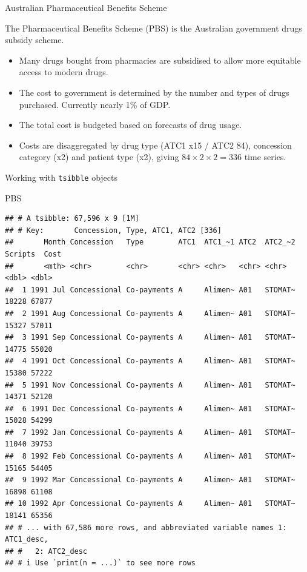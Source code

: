 \documentclass[14pt,ignorenonframetext,aspectratio=169]{beamer}
\newenvironment{Shaded}{\begin{snugshade}}{\end{snugshade}}
\newcommand{\NormalTok}[1]{#1}
\providecommand{\tightlist}{%
  \setlength{\itemsep}{0pt}\setlength{\parskip}{0pt}}
\renewenvironment{Shaded}{\color{black}\begin{snugshade}\color{black}}{\end{snugshade}}
\renewenvironment{Shaded}{\color{black}\fontsize{10}{10}\sf\begin{snugshade}\color{black}}{\end{snugshade}}
\begin{document}
\begin{frame}{Australian Pharmaceutical Benefits Scheme}
\protect\hypertarget{australian-pharmaceutical-benefits-scheme-1}{}
\begin{block}{}
The \alert{Pharmaceutical Benefits Scheme} (PBS) is the Australian government drugs subsidy scheme.
\end{block}
\pause\fontsize{13.3}{15}\sf

\begin{itemize}
\tightlist
\item
  Many drugs bought from pharmacies are subsidised to allow more
  equitable access to modern drugs.
\item
  The cost to government is determined by the number and types of drugs
  purchased. Currently nearly 1\% of GDP.
\item
  The total cost is budgeted based on forecasts of drug usage.
\item
  Costs are disaggregated by drug type (ATC1 x15 / ATC2 84), concession
  category (x2) and patient type (x2), giving \(84\times2\times2=336\)
  time series.
\end{itemize}
\end{frame}

\begin{frame}[fragile]{Working with \texttt{tsibble} objects}
\protect\hypertarget{working-with-tsibble-objects}{}
\fontsize{8}{10}\sf

\begin{Shaded}
\begin{Highlighting}[]
\NormalTok{PBS}
\end{Highlighting}
\end{Shaded}

\begin{verbatim}
## # A tsibble: 67,596 x 9 [1M]
## # Key:       Concession, Type, ATC1, ATC2 [336]
##       Month Concession   Type        ATC1  ATC1_~1 ATC2  ATC2_~2 Scripts  Cost
##       <mth> <chr>        <chr>       <chr> <chr>   <chr> <chr>     <dbl> <dbl>
##  1 1991 Jul Concessional Co-payments A     Alimen~ A01   STOMAT~   18228 67877
##  2 1991 Aug Concessional Co-payments A     Alimen~ A01   STOMAT~   15327 57011
##  3 1991 Sep Concessional Co-payments A     Alimen~ A01   STOMAT~   14775 55020
##  4 1991 Oct Concessional Co-payments A     Alimen~ A01   STOMAT~   15380 57222
##  5 1991 Nov Concessional Co-payments A     Alimen~ A01   STOMAT~   14371 52120
##  6 1991 Dec Concessional Co-payments A     Alimen~ A01   STOMAT~   15028 54299
##  7 1992 Jan Concessional Co-payments A     Alimen~ A01   STOMAT~   11040 39753
##  8 1992 Feb Concessional Co-payments A     Alimen~ A01   STOMAT~   15165 54405
##  9 1992 Mar Concessional Co-payments A     Alimen~ A01   STOMAT~   16898 61108
## 10 1992 Apr Concessional Co-payments A     Alimen~ A01   STOMAT~   18141 65356
## # ... with 67,586 more rows, and abbreviated variable names 1: ATC1_desc,
## #   2: ATC2_desc
## # i Use `print(n = ...)` to see more rows
\end{verbatim}
\end{frame}
\end{document}
